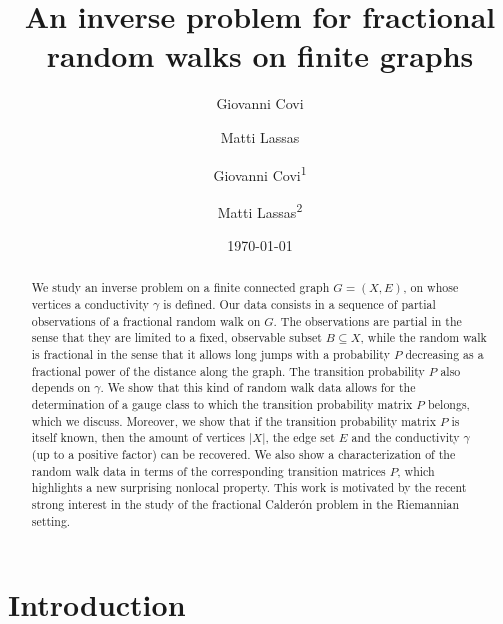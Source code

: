 \documentclass[a4paper,11pt,oneside]{amsart}
\title[Fractional random walks]{An inverse problem for fractional random walks on finite graphs}
\author{Giovanni Covi}
\author{Matti Lassas}
\date{\today}
\author{Giovanni Covi\textsuperscript{1}}
\author{Matti Lassas\textsuperscript{2}}
\begin{document}
\setlength{\baselineskip}{24.09pt}

\maketitle
\begin{abstract}
We study an inverse problem on a finite connected graph $G=(X,E)$, on whose vertices a conductivity $\gamma$ is defined. Our data consists in a sequence of partial observations of a fractional random walk on $G$. The observations are partial in the sense that they are limited to a fixed, observable subset $B\subseteq X$, while the random walk is fractional in the sense that it allows long jumps with a probability $P$ decreasing as a fractional power of the distance along the graph. The transition probability $P$ also depends on $\gamma$. We show that this kind of random walk data allows for the determination of a gauge class to which the transition probability matrix $P$ belongs, which we discuss. Moreover, we show that if the transition probability matrix $P$ is itself known, then the amount of vertices $|X|$, the edge set $E$ and the conductivity $\gamma$ (up to a positive factor) can be recovered. We also show a characterization of the random walk data in terms of the corresponding transition matrices $P$, which highlights a new surprising nonlocal property. This work is motivated by the recent strong interest in the study of the fractional Calder\'on problem in the Riemannian setting. 
\end{abstract}


\section{Introduction}
\end{document}
